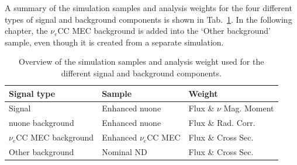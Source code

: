 A summary of the simulation samples and analysis weights for the four different types of signal and background components is shown in Tab.~\ref{tab:NuMMSamplesAndWeightsOverview}. In the following chapter, the $\nu_e$\gls{CC} \gls{MEC} background is added into the `Other background' sample, even though it is created from a separate simulation.

\begin{table}[!ht]
\centering
\caption{Overview of the simulation samples and analysis weight used for the different signal and background components.}
\def\arraystretch{1.4}
\begin{tabular}{l@{\hskip 1cm}l@{\hskip 1cm}l}
Signal type            & Sample               & Weight\\\hline
Signal                 & Enhanced \gls{nuone} & Flux \& $\nu$ Mag. Moment\\
\gls{nuone} background & Enhanced \gls{nuone} & Flux \& Rad. Corr.\\
$\nu_e$\gls{CC} \gls{MEC} background & Enhanced $\nu_e$\gls{CC} \gls{MEC} & Flux \& Cross Sec.\\
Other background       & Nominal \gls{ND}     & Flux \& Cross Sec.
\end{tabular}
\label{tab:NuMMSamplesAndWeightsOverview}
\end{table}

